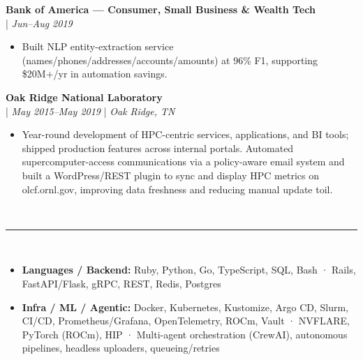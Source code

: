 \documentclass[11pt,a4paper]{article}
\newcommand{\resumesection}[1]{
    \vspace{3pt}                                    %
    \noindent{\fontsize{13}{15}\selectfont\textbf{#1}}\\[-8pt]                    %
    \noindent\textcolor{gray}{\rule{\textwidth}{2pt}}\\[-10pt]  %
}
\newcommand{\regbullet}[1]{
    \item {\fontsize{10}{12}\selectfont #1}
}
\begin{document}
\vspace{8pt}
\noindent\textbf{Bank of America — Consumer, Small Business \& Wealth Tech}\\
  |  {\fontsize{10}{12}\selectfont\textit{Jun--Aug 2019}}
\begin{itemize}[leftmargin=18pt,itemsep=1pt,topsep=0pt]
\regbullet{Built NLP entity-extraction service (names/phones/addresses/accounts/amounts) at 96\% F1, supporting \$20M+/yr in automation savings.}
\end{itemize}

\vspace{8pt}
\noindent\textbf{Oak Ridge National Laboratory}\\
  |  {\fontsize{10}{12}\selectfont\textit{May 2015--May 2019}}  |  {\fontsize{10}{12}\selectfont\textit{Oak Ridge, TN}}
\begin{itemize}[leftmargin=18pt,itemsep=1pt,topsep=0pt]
\regbullet{Year-round development of HPC-centric services, applications, and BI tools; shipped production features across internal portals. Automated supercomputer-access communications via a policy-aware email system and built a WordPress/REST plugin to sync and display HPC metrics on olcf.ornl.gov, improving data freshness and reducing manual update toil.}
\end{itemize}


\resumesection{Skills}

\begin{itemize}[leftmargin=18pt,itemsep=1pt,topsep=0pt]
\regbullet{\textbf{Languages / Backend:} Ruby, Python, Go, TypeScript, SQL, Bash · Rails, FastAPI/Flask, gRPC, REST, Redis, Postgres}

\regbullet{\textbf{Infra / ML / Agentic:} Docker, Kubernetes, Kustomize, Argo CD, Slurm, CI/CD, Prometheus/Grafana, OpenTelemetry, ROCm, Vault · NVFLARE, PyTorch (ROCm), HIP · Multi-agent orchestration (CrewAI), autonomous pipelines, headless uploaders, queueing/retries}
\end{itemize}
\end{document}

